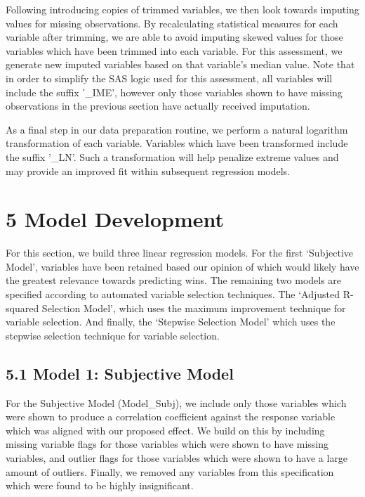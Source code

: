 \documentclass[]{article}
\begin{document}
Following introducing copies of trimmed variables, we then look towards
imputing values for missing observations. By recalculating statistical
measures for each variable after trimming, we are able to avoid imputing
skewed values for those variables which have been trimmed into each
variable. For this assessment, we generate new imputed variables based
on that variable's median value. Note that in order to simplify the SAS
logic used for this assessment, all variables will include the suffix
'\_IME', however only those variables shown to have missing observations
in the previous section have actually received imputation.

As a final step in our data preparation routine, we perform a natural
logarithm transformation of each variable. Variables which have been
transformed include the suffix '\_LN'. Such a transformation will help
penalize extreme values and may provide an improved fit within
subsequent regression models.

\section{5 Model Development}\label{model-development}

For this section, we build three linear regression models. For the first
`Subjective Model', variables have been retained based our opinion of
which would likely have the greatest relevance towards predicting wins.
The remaining two models are specified according to automated variable
selection techniques. The `Adjusted R-squared Selection Model', which
uses the maximum improvement technique for variable selection. And
finally, the `Stepwise Selection Model' which uses the stepwise
selection technique for variable selection.

\subsection{5.1 Model 1: Subjective
Model}\label{model-1-subjective-model}

For the Subjective Model (Model\_Subj), we include only those variables
which were shown to produce a correlation coefficient against the
response variable which was aligned with our proposed effect. We build
on this by including missing variable flags for those variables which
were shown to have missing variables, and outlier flags for those
variables which were shown to have a large amount of outliers. Finally,
we removed any variables from this specification which were found to be
highly insignificant.
\end{document}
